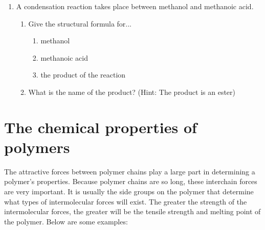 {\begin{enumerate}
{	\begin{enumerate}
	\item{Give the structural formula of the monomer in this polymer.}
	\item{What is the name of the monomer?}
	\item{Draw the abbreviated structural formula for the polymer.}
	\item{Has this polymer been formed through an addition or condensation polymerisation reaction?}
	\end{enumerate}

}

\item{A condensation reaction takes place between methanol and methanoic acid.}
	\begin{enumerate}
	\item{Give the structural formula for...}
		\begin{enumerate}
		\item{methanol}	
		\item{methanoic acid}
		\item{the product of the reaction}
		\end{enumerate}
	\item{What is the name of the product? (Hint: The product is an ester)}
	\end{enumerate}

\end{enumerate}
}






\section{The chemical properties of polymers}
\label{subsec:orgmac:properties}

The attractive forces between polymer chains play a large part in determining a polymer's properties. Because polymer chains are so long, these interchain forces are very important. It is usually the side groups on the polymer that determine what types of intermolecular forces will exist. The greater the strength of the intermolecular forces, the greater will be the tensile strength and melting point of the polymer. Below are some examples:

